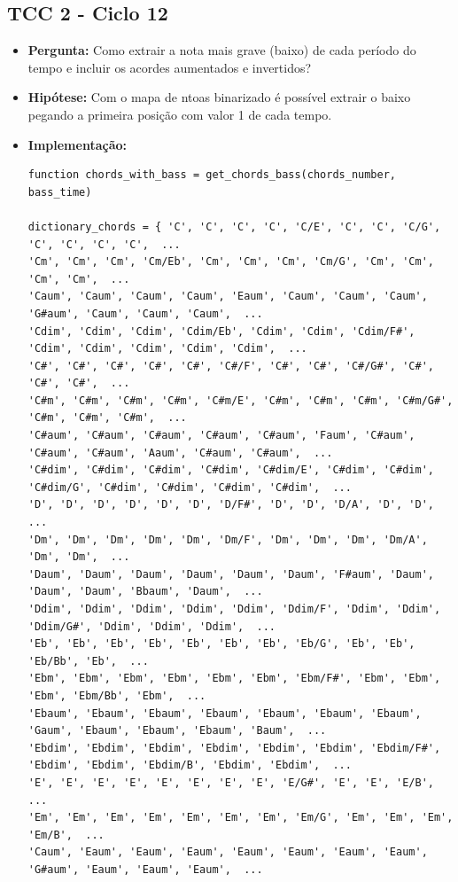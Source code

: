 \subsection{TCC 2 - Ciclo 12}
\begin{itemize}
\item \textbf{Pergunta:} Como extrair a nota mais grave (baixo) de cada período do tempo e incluir os acordes aumentados e invertidos?
\item \textbf{Hipótese:} Com o mapa de ntoas binarizado é possível extrair o baixo pegando a primeira posição com valor 1 de cada tempo.
\item \textbf{Implementação:}
\begin{lstlisting}
function chords_with_bass = get_chords_bass(chords_number, bass_time)

dictionary_chords = { 'C', 'C', 'C', 'C', 'C/E', 'C', 'C', 'C/G', 'C', 'C', 'C', 'C',  ... 
'Cm', 'Cm', 'Cm', 'Cm/Eb', 'Cm', 'Cm', 'Cm', 'Cm/G', 'Cm', 'Cm', 'Cm', 'Cm',  ... 
'Caum', 'Caum', 'Caum', 'Caum', 'Eaum', 'Caum', 'Caum', 'Caum', 'G#aum', 'Caum', 'Caum', 'Caum',  ... 
'Cdim', 'Cdim', 'Cdim', 'Cdim/Eb', 'Cdim', 'Cdim', 'Cdim/F#', 'Cdim', 'Cdim', 'Cdim', 'Cdim', 'Cdim',  ... 
'C#', 'C#', 'C#', 'C#', 'C#', 'C#/F', 'C#', 'C#', 'C#/G#', 'C#', 'C#', 'C#',  ... 
'C#m', 'C#m', 'C#m', 'C#m', 'C#m/E', 'C#m', 'C#m', 'C#m', 'C#m/G#', 'C#m', 'C#m', 'C#m',  ... 
'C#aum', 'C#aum', 'C#aum', 'C#aum', 'C#aum', 'Faum', 'C#aum', 'C#aum', 'C#aum', 'Aaum', 'C#aum', 'C#aum',  ... 
'C#dim', 'C#dim', 'C#dim', 'C#dim', 'C#dim/E', 'C#dim', 'C#dim', 'C#dim/G', 'C#dim', 'C#dim', 'C#dim', 'C#dim',  ... 
'D', 'D', 'D', 'D', 'D', 'D', 'D/F#', 'D', 'D', 'D/A', 'D', 'D',  ... 
'Dm', 'Dm', 'Dm', 'Dm', 'Dm', 'Dm/F', 'Dm', 'Dm', 'Dm', 'Dm/A', 'Dm', 'Dm',  ... 
'Daum', 'Daum', 'Daum', 'Daum', 'Daum', 'Daum', 'F#aum', 'Daum', 'Daum', 'Daum', 'Bbaum', 'Daum',  ... 
'Ddim', 'Ddim', 'Ddim', 'Ddim', 'Ddim', 'Ddim/F', 'Ddim', 'Ddim', 'Ddim/G#', 'Ddim', 'Ddim', 'Ddim',  ... 
'Eb', 'Eb', 'Eb', 'Eb', 'Eb', 'Eb', 'Eb', 'Eb/G', 'Eb', 'Eb', 'Eb/Bb', 'Eb',  ... 
'Ebm', 'Ebm', 'Ebm', 'Ebm', 'Ebm', 'Ebm', 'Ebm/F#', 'Ebm', 'Ebm', 'Ebm', 'Ebm/Bb', 'Ebm',  ... 
'Ebaum', 'Ebaum', 'Ebaum', 'Ebaum', 'Ebaum', 'Ebaum', 'Ebaum', 'Gaum', 'Ebaum', 'Ebaum', 'Ebaum', 'Baum',  ... 
'Ebdim', 'Ebdim', 'Ebdim', 'Ebdim', 'Ebdim', 'Ebdim', 'Ebdim/F#', 'Ebdim', 'Ebdim', 'Ebdim/B', 'Ebdim', 'Ebdim',  ... 
'E', 'E', 'E', 'E', 'E', 'E', 'E', 'E', 'E/G#', 'E', 'E', 'E/B',  ... 
'Em', 'Em', 'Em', 'Em', 'Em', 'Em', 'Em', 'Em/G', 'Em', 'Em', 'Em', 'Em/B',  ... 
'Caum', 'Eaum', 'Eaum', 'Eaum', 'Eaum', 'Eaum', 'Eaum', 'Eaum', 'G#aum', 'Eaum', 'Eaum', 'Eaum',  ... 

\end{lstlisting}
\end{itemize}
